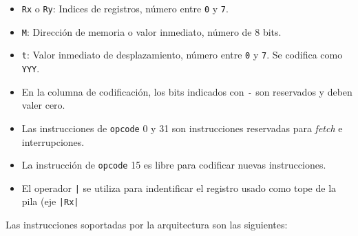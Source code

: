 \documentclass[a4paper,11pt]{article}
\begin{document}
\small
\begin{itemize}
 \setlength\itemsep{0em}
 \item \texttt{Rx} o \texttt{Ry}: Indices de registros, número entre \texttt{0} y \texttt{7}.
 \item \texttt{M}: Dirección de memoria o valor inmediato, número de 8 bits.
 \item \texttt{t}: Valor inmediato de desplazamiento, número entre \texttt{0} y \texttt{7}. Se codifica como \texttt{YYY}.
 \item En la columna de codificación, los bits indicados con \texttt{-} son reservados y deben valer cero.
 \item Las instrucciones de \texttt{opcode} 0 y 31 son instrucciones reservadas para \emph{fetch} e interrupciones.
 \item La instrucción de \texttt{opcode} 15 es libre para codificar nuevas instrucciones.
 \item El operador \texttt{|} se utiliza para indentificar el registro usado como tope de la pila (eje \texttt{|Rx|}
\end{itemize}
\normalsize

\noindent Las instrucciones soportadas por la arquitectura son las siguientes:
\end{document}
